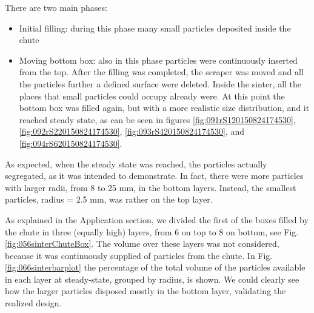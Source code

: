 There are two main phases:
\begin{itemize}
  \item{Initial filling: during this phase many small particles deposited inside
  the chute}
  \item{Moving bottom box: also in this phase particles were
continuously inserted from the top. After the filling was completed, the
scraper was moved and all the particles further a defined surface were
deleted. Inside the sinter, all the places that small particles could
occupy already were. At this point the bottom box was filled again, but
with a more realistic size distribution, and it reached steady state, as can
be seen in figures \ref{fig:091rS120150824174530}, \ref{fig:092rS220150824174530}, \ref{fig:093rS420150824174530}, and
\ref{fig:094rS620150824174530}.}
\end{itemize}
As expected, when the steady state was reached, the particles actually
segregated, as it was intended to demonstrate.
In fact, there were more particles with larger radii, from 8 to 25 mm, in the
bottom layers.
Instead, the smallest particles, radius = 2.5 mm, was rather on the top layer. 


As explained in the Application section, we divided the first of the boxes
filled by the chute in three (equally high) layers, from 6 on top to 8 
on bottom, see Fig. \ref{fig:056sinterChuteBox}. 
The volume over these layers was not considered, because it was continuously 
supplied of particles from the chute. In Fig. \ref{fig:066sinterbarplot} the
percentage of the total volume of the particles available in each layer at steady-state, 
grouped by radius, is shown. 
We could clearly see how the larger particles disposed mostly 
in the bottom layer, validating the realized design.




